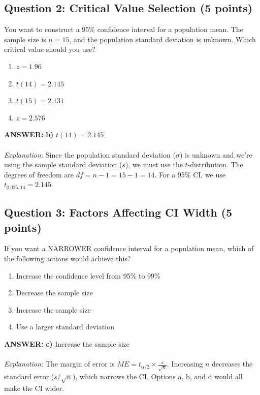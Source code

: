 \documentclass[11pt]{article}
\newcommand{\answer}[1]{\par\vspace{0.3em}\colorbox{green!10}{\parbox{\dimexpr\textwidth-2\fboxsep}{\textbf{ANSWER:} #1}}\vspace{0.3em}\par}
\begin{document}
\subsection*{Question 2: Critical Value Selection (5 points)}

You want to construct a 95\% confidence interval for a population mean. The sample size is $n = 15$, and the population standard deviation is unknown. Which critical value should you use?

\begin{enumerate}[label=\alph*)]
\item $z = 1.96$
\item $t(14) = 2.145$
\item $t(15) = 2.131$
\item $z = 2.576$
\end{enumerate}

\answer{\textbf{b)} $t(14) = 2.145$ \\ \\
\textit{Explanation:} Since the population standard deviation ($\sigma$) is unknown and we're using the sample standard deviation ($s$), we must use the $t$-distribution. The degrees of freedom are $df = n - 1 = 15 - 1 = 14$. For a 95\% CI, we use $t_{0.025, 14} = 2.145$.}

\subsection*{Question 3: Factors Affecting CI Width (5 points)}

If you want a NARROWER confidence interval for a population mean, which of the following actions would achieve this?

\begin{enumerate}[label=\alph*)]
\item Increase the confidence level from 95\% to 99\%
\item Decrease the sample size
\item Increase the sample size
\item Use a larger standard deviation
\end{enumerate}

\answer{\textbf{c)} Increase the sample size \\ \\
\textit{Explanation:} The margin of error is $ME = t_{\alpha/2} \times \frac{s}{\sqrt{n}}$. Increasing $n$ decreases the standard error ($s/\sqrt{n}$), which narrows the CI. Options a, b, and d would all make the CI wider.}
\end{document}
